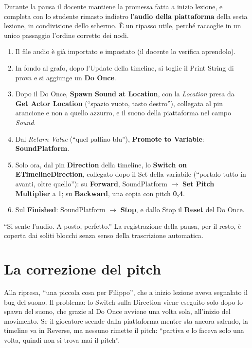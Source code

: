 Durante la pausa il docente mantiene la promessa fatta a inizio lezione, e completa con
lo studente rimasto indietro l'\textbf{audio della piattaforma} della sesta lezione, in
condivisione dello schermo. È un ripasso utile, perché raccoglie in un unico passaggio
l'ordine corretto dei nodi.
\begin{enumerate}
  \item Il file audio è già importato e impostato (il docente lo verifica aprendolo).
  \item In fondo al grafo, dopo l'Update della timeline, si toglie il Print String di
        prova e si aggiunge un \textbf{Do Once}.
  \item Dopo il Do Once, \textbf{Spawn Sound at Location}, con la \emph{Location} presa
        da \textbf{Get Actor Location} (``spazio vuoto, tasto destro''), collegata al pin
        arancione e non a quello azzurro, e il suono della piattaforma nel campo
        \emph{Sound}.
  \item Dal \emph{Return Value} (``quel pallino blu''), \textbf{Promote to Variable}:
        \textbf{SoundPlatform}.
  \item Solo ora, dal pin \textbf{Direction} della timeline, lo \textbf{Switch on
        ETimelineDirection}, collegato dopo il Set della variabile (``portalo tutto in
        avanti, oltre quello''): su \textbf{Forward}, SoundPlatform $\rightarrow$
        \textbf{Set Pitch Multiplier} a 1; su \textbf{Backward}, una copia con pitch
        \textbf{0,4}.
  \item Sul \textbf{Finished}: SoundPlatform $\rightarrow$ \textbf{Stop}, e dallo Stop
        il \textbf{Reset} del Do Once.
\end{enumerate}
``Si sente l'audio. A posto, perfetto.'' La registrazione della pausa, per il resto, è
coperta dai soliti blocchi senza senso della trascrizione automatica.

\section{La correzione del pitch}
\label{ue7:sec:pitch}

Alla ripresa, ``una piccola cosa per Filippo'', che a inizio lezione aveva segnalato il
bug del suono. Il problema: lo Switch sulla Direction viene eseguito solo dopo lo spawn
del suono, che grazie al Do Once avviene una volta sola, all'inizio del movimento. Se il
giocatore scende dalla piattaforma mentre sta ancora salendo, la timeline va in Reverse,
ma nessuno rimette il pitch: ``partiva e lo faceva solo una volta, quindi non si trova
mai il pitch''.

